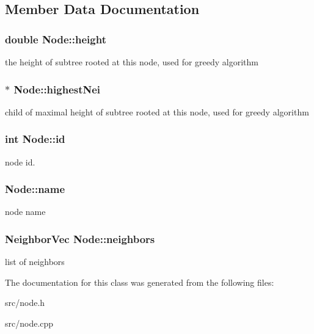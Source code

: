 \subsection{Member Data Documentation}
\hypertarget{classNode_aa0f22093957939b69e2872893ac6bccd}{
\subsubsection[{height}]{\setlength{\rightskip}{0pt plus 5cm}double {\bf Node::height}}}
\label{classNode_aa0f22093957939b69e2872893ac6bccd}
the height of subtree rooted at this node, used for greedy algorithm \hypertarget{classNode_a2683e662b7577fbd5a5b78a9d2976a17}{
\subsubsection[{highestNei}]{$\ast$ {\bf Node::highestNei}}}
\label{classNode_a2683e662b7577fbd5a5b78a9d2976a17}
child of maximal height of subtree rooted at this node, used for greedy algorithm \hypertarget{classNode_a59a543130a10c95f1e8642cf8c5645e8}{
\subsubsection[{id}]{\setlength{\rightskip}{0pt plus 5cm}int {\bf Node::id}}}
\label{classNode_a59a543130a10c95f1e8642cf8c5645e8}
node id. \hypertarget{classNode_a57c014f7366ed417746d92336d869510}{
\subsubsection[{name}]{ {\bf Node::name}}}
\label{classNode_a57c014f7366ed417746d92336d869510}
node name \hypertarget{classNode_a35de03872f10f71851fe4c115a981d93}{
\subsubsection[{neighbors}]{\setlength{\rightskip}{0pt plus 5cm}NeighborVec {\bf Node::neighbors}}}
\label{classNode_a35de03872f10f71851fe4c115a981d93}
list of neighbors 

The documentation for this class was generated from the following files:\begin{DoxyCompactItemize}
\item 
src/node.h\item 
src/node.cpp\end{DoxyCompactItemize}
